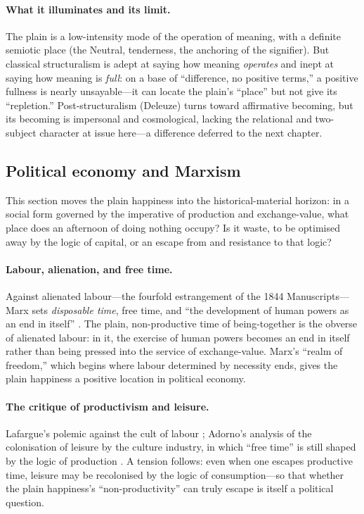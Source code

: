 \paragraph{What it illuminates and its limit.} The plain is a low-intensity mode of the operation of meaning, with a definite semiotic place (the Neutral, tenderness, the anchoring of the signifier). But classical structuralism is adept at saying how meaning \emph{operates} and inept at saying how meaning is \emph{full}: on a base of ``difference, no positive terms,'' a positive fullness is nearly unsayable---it can locate the plain's ``place'' but not give its ``repletion.'' Post-structuralism (Deleuze) turns toward affirmative becoming, but its becoming is impersonal and cosmological, lacking the relational and two-subject character at issue here---a difference deferred to the next chapter.

\subsection{Political economy and Marxism}
\label{p19:sub:theories-politecon}

This section moves the plain happiness into the historical-material horizon: in a social form governed by the imperative of production and exchange-value, what place does an afternoon of doing nothing occupy? Is it waste, to be optimised away by the logic of capital, or an escape from and resistance to that logic?

\paragraph{Labour, alienation, and free time.} Against alienated labour---the fourfold estrangement of the 1844 Manuscripts---Marx sets \emph{disposable time}, free time, and ``the development of human powers as an end in itself'' \parencite{marxgrundrisse1973,marx1976}. The plain, non-productive time of being-together is the obverse of alienated labour: in it, the exercise of human powers becomes an end in itself rather than being pressed into the service of exchange-value. Marx's ``realm of freedom,'' which begins where labour determined by necessity ends, gives the plain happiness a positive location in political economy.

\paragraph{The critique of productivism and leisure.} Lafargue's polemic against the cult of labour \parencite{lafargue1883}; Adorno's analysis of the colonisation of leisure by the culture industry, in which ``free time'' is still shaped by the logic of production \parencite{adorno1991}. A tension follows: even when one escapes productive time, leisure may be recolonised by the logic of consumption---so that whether the plain happiness's ``non-productivity'' can truly escape is itself a political question.

